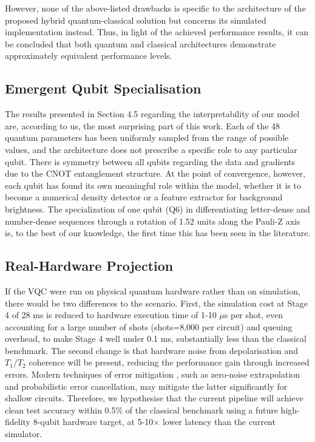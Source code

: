 \documentclass[preprint,12pt]{elsarticle}
\begin{document}
However, none of the above-listed drawbacks is specific to the architecture of the proposed hybrid quantum-classical solution but concerns its simulated implementation instead. Thus, in light of the achieved performance results, it can be concluded that both quantum and classical architectures demonstrate approximately equivalent performance levels.

\subsection{Emergent Qubit Specialisation}
The results presented in Section 4.5 regarding the interpretability of our model are, according to us, the most surprising part of this work. Each of the 48 quantum parameters has been uniformly sampled from the range of possible values, and the architecture does not prescribe a specific role to any particular qubit. There is symmetry between all qubits regarding the data and gradients due to the CNOT entanglement structure. At the point of convergence, however, each qubit has found its own meaningful role within the model, whether it is to become a numerical density detector or a feature extractor for background brightness. The specialization of one qubit (Q6) in differentiating letter-dense and number-dense sequences through a rotation of 1.52 units along the Pauli-Z axis is, to the best of our knowledge, the first time this has been seen in the literature.

\subsection{Real-Hardware Projection}
If the VQC were run on physical quantum hardware rather than on simulation, there would be two differences to the scenario. First, the simulation cost at Stage 4 of 28 ms is reduced to hardware execution time of 1-10 $\mu$s per shot, even accounting for a large number of shots (shots=8,000 per circuit) and queuing overhead, to make Stage 4 well under 0.1 ms, substantially less than the classical benchmark. The second change is that hardware noise from depolarisation and $T_1/T_2$ coherence will be present, reducing the performance gain through increased errors. Modern techniques of error mitigation \cite{b10}, such as zero-noise extrapolation and probabilistic error cancellation, may mitigate the latter significantly for shallow circuits. Therefore, we hypothesise that the current pipeline will achieve clean test accuracy within 0.5\% of the classical benchmark using a future high-fidelity 8-qubit hardware target, at 5-10$\times$ lower latency than the current simulator.
\end{document}
